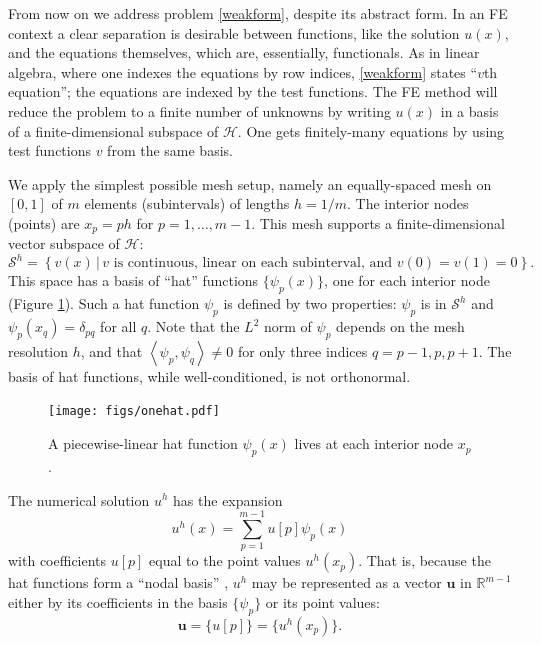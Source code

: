 \documentclass[letterpaper,final,12pt,reqno]{amsart}
\newcommand{\RR}{\mathbb{R}}
\newcommand{\bu}{\mathbf{u}}
\newcommand{\ip}[2]{\left<#1,#2\right>}
\begin{document}
From now on we address problem \eqref{weakform}, despite its abstract form.  In an FE context a clear separation is desirable between functions, like the solution $u(x)$, and the equations themselves, which are, essentially, functionals.  As in linear algebra, where one indexes the equations by row indices, \eqref{weakform} states ``$v$th equation''; the equations are indexed by the test functions.  The FE method will reduce the problem to a finite number of unknowns by writing $u(x)$ in a basis of a finite-dimensional subspace of $\mathcal{H}$.  One gets finitely-many equations by using test functions $v$ from the same basis.

We apply the simplest possible mesh setup, namely an equally-spaced mesh on $[0,1]$ of $m$ elements (subintervals) of lengths $h=1/m$.  The interior nodes (points) are $x_p=ph$ for $p=1,\dots,m-1$.  This mesh supports a finite-dimensional vector subspace of $\mathcal{H}$:
\begin{equation}
\mathcal{S}^h = \left\{v(x)\,\big|\,v \text{ is continuous, linear on each subinterval, and } v(0)=v(1)=0\right\}.  \label{fespace}
\end{equation}
This space has a basis of ``hat'' functions $\{\psi_p(x)\}$, one for each interior node (Figure \ref{fig:onehat}).  Such a hat function $\psi_p$ is defined by two properties: $\psi_p$ is in $\mathcal{S}^h$ and $\psi_p(x_q)=\delta_{pq}$ for all $q$.  Note that the $L^2$ norm of $\psi_p$ depends on the mesh resolution $h$, and that $\ip{\psi_p}{\psi_q}\ne 0$ for only three indices $q=p-1,p,p+1$.  The basis of hat functions, while well-conditioned, is not orthonormal.

\begin{figure}
\texttt{[image: figs/onehat.pdf]}
\caption{A piecewise-linear hat function $\psi_p(x)$ lives at each interior node $x_p$.}
\label{fig:onehat}
\end{figure}

The numerical solution $u^h$ has the expansion
\begin{equation}
  u^h(x) = \sum_{p=1}^{m-1} u[p] \psi_p(x)  \label{fesolution}
\end{equation}
with coefficients $u[p]$ equal to the point values $u^h(x_p)$.  That is, because the hat functions form a ``nodal basis'' \cite{Elmanetal2014}, $u^h$ may be represented as a vector $\bu$ in $\RR^{m-1}$ either by its coefficients in the basis $\{\psi_p\}$ or its point values:
\begin{equation}
\bu =\{u[p]\} = \{u^h(x_p)\}.  \label{fevector}
\end{equation}
\end{document}
